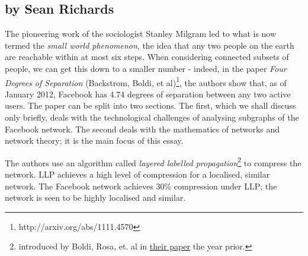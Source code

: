     \subsection{by Sean Richards}
    
    The pioneering work of the sociologist Stanley Milgram led to what is now termed the \textit{small world phenomenon}, the idea that any two people on the earth are reachable within at most six steps. When considering connected subsets of people, we can get this down to a smaller number - indeed, in the paper \textit{Four Degrees of Separation} (Backstrom, Boldi, et al)\footnote{http://arxiv.org/abs/1111.4570}, the authors show that, as of January 2012, Facebook has 4.74 degrees of separation between any two active users. The paper can be split into two sections. The first, which we shall discuss only briefly, deals with the technological challenges of analysing subgraphs of the Facebook network. The second deals with the mathematics of networks and network theory; it is the main focus of this essay.
    
    The authors use an algorithm called \textit{layered labelled propagation}\footnote{introduced by Boldi, Rosa, et. al in \href{https://arxiv.org/pdf/1011.5425.pdf}{their paper} the year prior.} to compress the network. LLP achieves a high level of compression for a localised, similar network. The Facebook network achieves 30\% compression under LLP; the network is seen to be highly localised and similar. 
    
